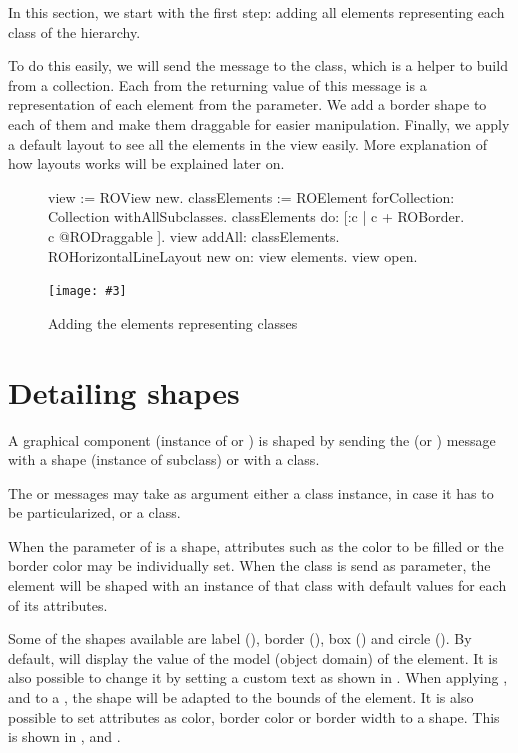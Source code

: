 \documentclass[a4paper,10pt,twoside]{book}
\newcommand{\fig}[4]{
		\begin{figure}[#1]
			\centering
			\texttt{[image: \#3]}
			\caption{\label{fig:#3}#4}
		\end{figure}}
\begin{document}
In this section, we start with the first step: adding all elements representing each class of the hierarchy. 

To do this easily, we will send the  message to the  class, which is a helper to build  from a collection. 
Each  from the returning value of this message is a representation of each element from the parameter. 
We add a border shape to each of them and make them draggable for easier manipulation.
Finally, we apply a default layout to see all the elements in the view easily. 
More explanation of how layouts works will be explained later on. 


\begin{figure}[H]
\begin{code}{}
view := ROView new.
classElements := ROElement forCollection: Collection withAllSubclasses.
classElements 
	do: [:c | c + ROBorder.
			c @RODraggable ].
view addAll: classElements.
ROHorizontalLineLayout new on: view elements.
view open.
\end{code}
\end{figure}

\fig{H}{0.6}{hier1}{Adding the elements representing classes}


\section{Detailing shapes} 

A graphical component (instance of  or ) is shaped by sending the \ct{+} (or ) message with a shape (instance of  subclass) or with a  class. 

The \ct{+} or  messages may take as argument either a class instance, in case it has to be particularized, or a class. 

When the parameter of \ct{+} is a shape, attributes such as the color to be filled or the border color may be individually set. When the class is send as parameter, the element will be shaped with an instance of that class with default values for each of its attributes.

Some of the shapes available are label (), border (), box () and circle (). By default,  will display the  value of the model (\ie object domain) of the element. It is also possible to change it by setting a custom text as shown in . When applying ,  and  to a , the shape will be adapted to the bounds of the element. It is also possible to set attributes as color, border color or border width to a shape. This is shown in ,  and .
\end{document}
